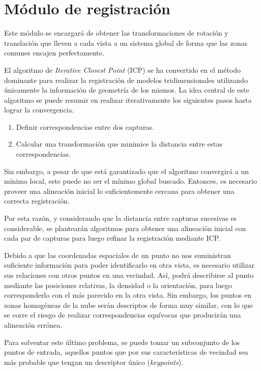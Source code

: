 \section{Módulo de registración}
	Este módulo se encargará de obtener las transformaciones de rotación y translación
	que lleven a cada vista a un sistema global de forma
	que las zonas comunes encajen perfectamente.



	El algoritmo de \emph{Iterative Closest Point} (ICP) se ha convertido en el
	método dominante para realizar la registración de modelos tridimensionales
	utilizando únicamente la información de geometría de los mismos. 
	La idea central de este algoritmo se puede resumir en realizar
	iterativamente los siguientes pasos hasta lograr la convergencia.
	\begin{enumerate}
		\item Definir correspondencias entre dos capturas.
		\item Calcular una transformación que minimice la distancia entre estas correspondencias.  
	\end{enumerate}
	Sin embargo, a pesar de que está garantizado que el algoritmo convergirá a un mínimo local,
	este puede no ser el mínimo global buscado. Entonces, es necesario proveer una alineación inicial
	lo suficientemente cercana para obtener una correcta registración.

	Por esta razón, y considerando que la distancia entre capturas sucesivas es
	considerable, se plantearán algoritmos para obtener una alineación inicial
	con cada par de capturas para luego refinar la registración mediante ICP.


	Debido a que las coordenadas espaciales de un punto no nos suministran suficiente
	información para poder identificarlo en otra vista, es necesario utilizar
	sus relaciones con otros puntos en una vecindad.
	Así, podrá describirse al punto mediante las posiciones relativas, la
	densidad o la orientación, para luego corresponderlo con el más parecido en
	la otra vista.
	Sin embargo, los puntos en zonas homogéneas de la nube serán descriptos de
	forma muy similar, con lo que se corre el riesgo de realizar
	correspondencias equívocas que producirán una alineación errónea.

	Para solventar este último problema, se puede tomar un subconjunto de los
	puntos de entrada, aquellos puntos que por sus características de vecindad
	sea más probable que tengan un descriptor único (\emph{keypoints}).

